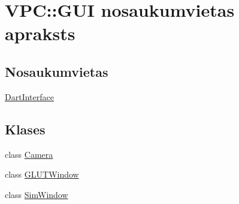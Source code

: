 \hypertarget{namespace_v_p_c_1_1_g_u_i}{}\section{V\+PC\+:\+:G\+UI nosaukumvietas apraksts}
\label{namespace_v_p_c_1_1_g_u_i}
\subsection*{Nosaukumvietas}
\begin{DoxyCompactItemize}
\item 
 \hyperlink{namespace_v_p_c_1_1_g_u_i_1_1_dart_interface}{Dart\+Interface}
\end{DoxyCompactItemize}
\subsection*{Klases}
\begin{DoxyCompactItemize}
\item 
class \hyperlink{class_v_p_c_1_1_g_u_i_1_1_camera}{Camera}
\item 
class \hyperlink{class_v_p_c_1_1_g_u_i_1_1_g_l_u_t_window}{G\+L\+U\+T\+Window}
\item 
class \hyperlink{class_v_p_c_1_1_g_u_i_1_1_sim_window}{Sim\+Window}
\end{DoxyCompactItemize}
